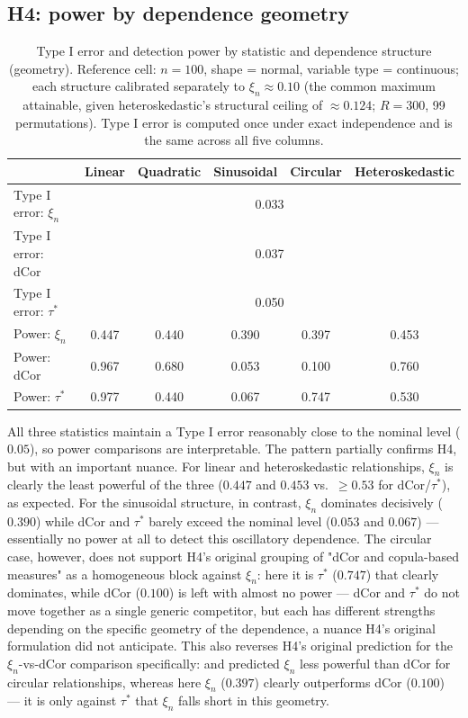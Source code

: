 \documentclass[article]{ajs}
\begin{document}
\subsection{H4: power by dependence geometry}

\begin{table}[H]
\caption{\label{tab:h4}Type I error and detection power by statistic and dependence structure (geometry). Reference cell: $n=100$, shape = normal, variable type = continuous; each structure calibrated separately to $\xi_n \approx 0.10$ (the common maximum attainable, given heteroskedastic's structural ceiling of $\approx 0.124$; $R=300$, 99 permutations). Type I error is computed once under exact independence and is the same across all five columns.}
\begin{center}
\small
\begin{tabular}{lccccc}
\toprule
 & Linear & Quadratic & Sinusoidal & Circular & Heteroskedastic \\
\midrule
Type I error: $\xi_n$      & \multicolumn{5}{c}{0.033} \\
Type I error: dCor         & \multicolumn{5}{c}{0.037} \\
Type I error: $\tau^\ast$  & \multicolumn{5}{c}{0.050} \\
\midrule
Power: $\xi_n$      & 0.447 & 0.440 & 0.390 & 0.397 & 0.453 \\
Power: dCor         & 0.967 & 0.680 & 0.053 & 0.100 & 0.760 \\
Power: $\tau^\ast$  & 0.977 & 0.440 & 0.067 & 0.747 & 0.530 \\
\bottomrule
\end{tabular}
\end{center}
\end{table}

All three statistics maintain a Type I error reasonably close to the
nominal level ($0.05$), so power comparisons are interpretable. The
pattern partially confirms H4, but with an important nuance. For
linear and heteroskedastic relationships, $\xi_n$ is clearly the least
powerful of the three ($0.447$ and $0.453$ vs.\ $\ge 0.53$ for
dCor/$\tau^\ast$), as expected. For the sinusoidal structure, in
contrast, $\xi_n$ dominates decisively ($0.390$) while dCor and
$\tau^\ast$ barely exceed the nominal level ($0.053$ and $0.067$) ---
essentially no power at all to detect this oscillatory dependence. The
circular case, however, does not support H4's original grouping of
"dCor and copula-based measures" as a homogeneous block against
$\xi_n$: here it is $\tau^\ast$ ($0.747$) that clearly dominates, while
dCor ($0.100$) is left with almost no power --- dCor and $\tau^\ast$ do
not move together as a single generic competitor, but each has
different strengths depending on the specific geometry of the
dependence, a nuance H4's original formulation did not anticipate. This
also reverses H4's original prediction for the $\xi_n$-vs-dCor
comparison specifically: \citet{chatterjee2021} and \citet{gao2024}
predicted $\xi_n$ less powerful than dCor for circular relationships,
whereas here $\xi_n$ ($0.397$) clearly outperforms dCor ($0.100$) ---
it is only against $\tau^\ast$ that $\xi_n$ falls short in this
geometry.
\end{document}
